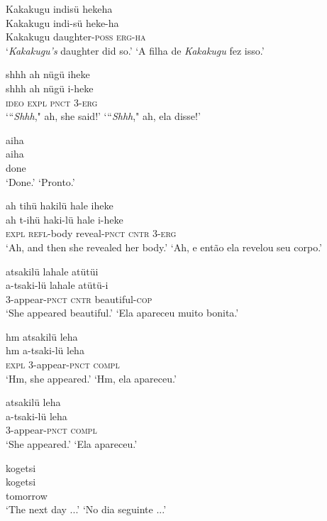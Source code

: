 \documentclass[output=paper,
modfonts,nonflat
]{langsci/langscibook}
\begin{document}
\ea  Kakakugu indisü hekeha\\[.3em]
\gll Kakakugu indi-sü heke-ha\\
     Kakakugu daughter-\textsc{poss} \textsc{erg}-\textsc{ha}\\
\glt ‘\textit{Kakakugu's} daughter did so.’
\glt ‘A filha de \textit{Kakakugu} fez isso.’
\z

\ea  shhh ah nügü iheke\\[.3em]
\gll shhh ah nügü i-heke\\
     \textsc{ideo} \textsc{expl} \textsc{pnct} 3-\textsc{erg}\\
\glt ‘“\textit{Shhh}," ah, she said!’
\glt ‘“\textit{Shhh}," ah, ela disse!’
\z

\ea  aiha\\[.3em]
\gll aiha\\
     done\\
\glt ‘Done.’
\glt ‘Pronto.’
\z

\ea  ah tihü hakilü hale iheke\\[.3em]
\gll ah t-ihü haki-lü hale i-heke\\
     \textsc{expl} \textsc{refl}-body reveal-\textsc{pnct} \textsc{cntr} 3-\textsc{erg}\\
\glt ‘Ah, and then she revealed her body.’
\glt ‘Ah, e então ela revelou seu corpo.’
\z

\ea  atsakilü lahale atütüi\\[.3em]
\gll a-tsaki-lü lahale atütü-i\\
     3-appear-\textsc{pnct} \textsc{cntr} beautiful-\textsc{cop}\\
\glt ‘She appeared beautiful.’
\glt ‘Ela apareceu muito bonita.’
\z

\ea  hm atsakilü leha\\[.3em]
\gll hm a-tsaki-lü leha\\
     \textsc{expl} 3-appear-\textsc{pnct} \textsc{compl}\\
\glt ‘Hm, she appeared.’
\glt ‘Hm, ela apareceu.’
\z

\ea  atsakilü leha\\[.3em]
\gll a-tsaki-lü leha\\
     3-appear-\textsc{pnct} \textsc{compl}\\
\glt ‘She appeared.’
\glt ‘Ela apareceu.’
\z

\ea  kogetsi\\[.3em]
\gll kogetsi\\
     tomorrow\\
\glt ‘The next day ...’
\glt ‘No dia seguinte ...’
\z
\end{document}
